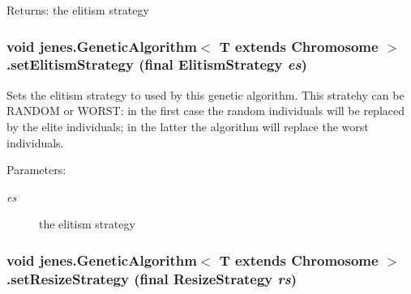 \begin{Desc}
\item[Returns:]the elitism strategy \end{Desc}
\hypertarget{classjenes_1_1_genetic_algorithm_3_01_t_01extends_01_chromosome_01_4_edc89ba915f6a528ef4052eb31a8c467}{
\subsubsection[setElitismStrategy]{\setlength{\rightskip}{0pt plus 5cm}void jenes.GeneticAlgorithm$<$ T extends Chromosome $>$.setElitismStrategy (final {\bf ElitismStrategy} {\em es})}}
\label{classjenes_1_1_genetic_algorithm_3_01_t_01extends_01_chromosome_01_4_edc89ba915f6a528ef4052eb31a8c467}


Sets the elitism strategy to used by this genetic algorithm. This stratehy can be RANDOM or WORST: in the first case the random individuals will be replaced by the elite individuals; in the latter the algorithm will replace the worst individuals. 

\begin{Desc}
\item[Parameters:]
\begin{description}
\item[{\em es}]the elitism strategy \end{description}
\end{Desc}
\hypertarget{classjenes_1_1_genetic_algorithm_3_01_t_01extends_01_chromosome_01_4_685af9b6322920d9431977fd25c5cf77}{
\subsubsection[setResizeStrategy]{\setlength{\rightskip}{0pt plus 5cm}void jenes.GeneticAlgorithm$<$ T extends Chromosome $>$.setResizeStrategy (final {\bf ResizeStrategy} {\em rs})}}
\label{classjenes_1_1_genetic_algorithm_3_01_t_01extends_01_chromosome_01_4_685af9b6322920d9431977fd25c5cf77}


